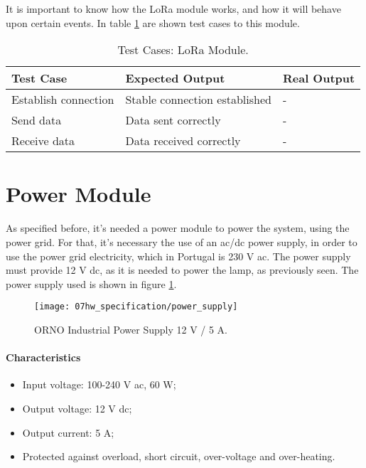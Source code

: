 It is important to know how the LoRa module works, and how it will behave upon certain events. In table \ref{table:test_lora} are shown test cases to this module.

\begin{table}[H]
	\centering
	\resizebox{\columnwidth}{!}
	{
		\begin{tabular}{|m{3cm}|m{5cm}||m{5cm}|}
			\hline
			\textbf{Test Case} & \textbf{Expected Output} & \textbf{Real Output}
			\\\hline\hline
			Establish connection & Stable connection established & -
			\\\hline
			Send data & Data sent correctly & -
			\\\hline
			Receive data & Data received correctly & -
			\\\hline
		\end{tabular}
	}
	\caption{Test Cases: LoRa Module.}
	\label{table:test_lora}
\end{table}

\section{Power Module}
As specified before, it's needed a power module to power the system, using the power grid. For that, it's necessary the use of an \ac{ac}/\ac{dc} power supply, in order to use the power grid electricity, which in Portugal is 230 V \ac{ac}. The power supply must provide 12 V \ac{dc}, as it is needed to power the lamp, as previously seen. The power supply used is shown in figure \ref{fig:power_supply}. \cite{power_supply}

\begin{figure}[H]
	\centering
	\texttt{[image: 07hw\_specification/power\_supply]}
	\caption{ORNO Industrial Power Supply 12 V / 5 A.}
	\label{fig:power_supply}
\end{figure}

\paragraph*{Characteristics}
\begin{itemize}
	\item Input voltage: 100-240 V \ac{ac}, 60 W;
	\item Output voltage: 12 V \ac{dc};
	\item Output current: 5 A;
	\item Protected against overload, short circuit, over-voltage and over-heating.
\end{itemize}

